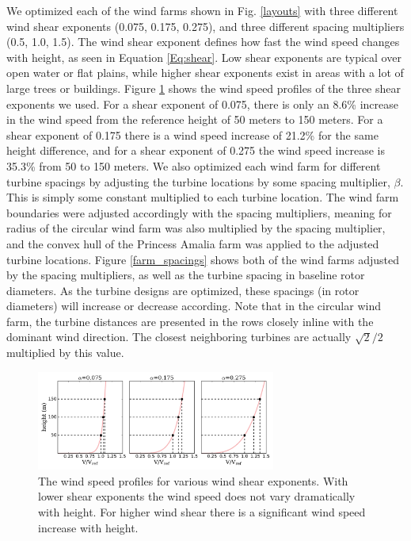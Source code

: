 \documentclass[wes, manuscript]{copernicus}
\begin{document}
We optimized each of the wind farms shown in Fig. \ref{layouts} with three different wind shear exponents (0.075, 0.175, 0.275), and three different spacing multipliers (0.5, 1.0, 1.5). The wind shear exponent defines how fast the wind speed changes with height, as seen in Equation \ref{Eq:shear}. Low shear exponents are typical over open water or flat plains, while higher shear exponents exist in areas with a lot of large trees or buildings. Figure \ref{shear_profile} shows the wind speed profiles of the three shear exponents we used. For a shear exponent of 0.075, there is only an 8.6\% increase in the wind speed from the reference height of 50 meters to 150 meters. For a shear exponent of 0.175 there is a wind speed increase of 21.2\% for the same height difference, and for a shear exponent of 0.275 the wind speed increase is 35.3\% from 50 to 150 meters. We also optimized each wind farm for different turbine spacings by adjusting the turbine locations by some spacing multiplier, $\beta$.  This is simply some constant multiplied to each turbine location. The wind farm boundaries were adjusted accordingly with the spacing multipliers, meaning for radius of the circular wind farm was also multiplied by the spacing multiplier, and the convex hull of the Princess Amalia farm was applied to the adjusted turbine locations. Figure \ref{farm_spacings} shows both of the wind farms adjusted by the spacing multipliers, as well as the turbine spacing in baseline rotor diameters. As the turbine designs are optimized, these spacings (in rotor diameters) will increase or decrease according. Note that in the circular wind farm, the turbine distances are presented in the rows closely inline with the dominant wind direction. The closest neighboring turbines are actually $\sqrt{2}/2$ multiplied by this value. 


\begin{figure}[htbp]
  \centering
  \includegraphics[width=0.7\textwidth]{Figures/shears.pdf}
  \caption{\label{shear_profile}The wind speed profiles for various wind shear exponents. With lower shear exponents the wind speed does not vary dramatically with height. For higher wind shear there is a significant wind speed increase with height.}
\end{figure}
\end{document}
